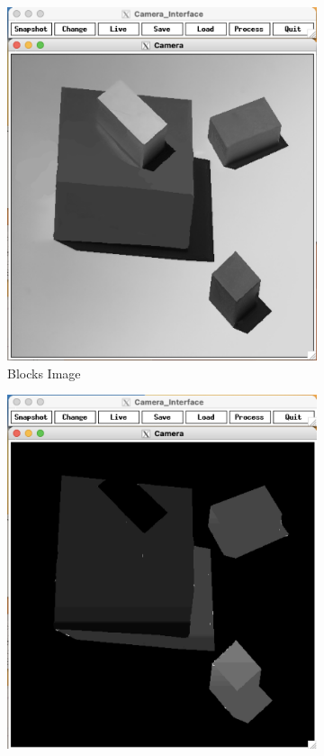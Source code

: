 \documentclass[12pt]{article}
\begin{document}
\begin{figure}
	\centering
	\begin{subfigure}[b]{0.475\textwidth}
		\centering
		\includegraphics[width=\textwidth]{hw3_results/blocks}
		\caption[]%
		{{\small Blocks Image}}    
		\label{fig:blocks}
	\end{subfigure}
	\hfill
	\begin{subfigure}[b]{0.475\textwidth}  
		\centering 
		\includegraphics[width=\textwidth]{hw3_results/p3_blocks}

\end{subfigure}
\end{figure}
\end{document}

